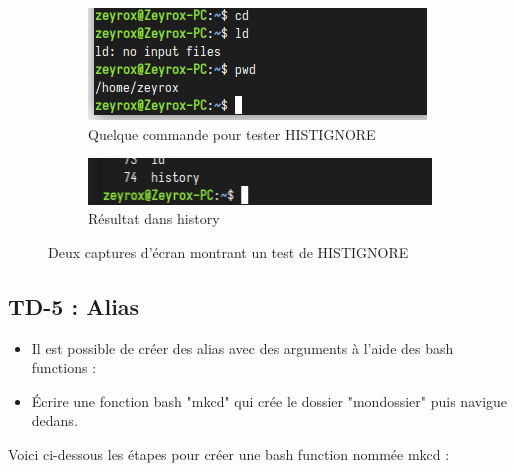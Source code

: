 \documentclass[12pt]{article}
\begin{document}
\begin{figure}[h]
  \centering
  \begin{subfigure}{0.45\textwidth}
    \centering
    \includegraphics[width=\textwidth]{Images-TD-Env-Efficiency/Image-TD-4/commande_test.png}
    \caption{Quelque commande pour tester HISTIGNORE}
  \end{subfigure}
  \vspace{0.9cm} %
  \begin{subfigure}{0.45\textwidth}
    \centering
    \includegraphics[width=\textwidth]{Images-TD-Env-Efficiency/Image-TD-4/history1.png}
    \caption{Résultat dans history}
  \end{subfigure}
  \caption{Deux captures d'écran montrant un test de HISTIGNORE}
\end{figure}

\subsection{TD-5 : Alias}

\begin{itemize}
  \item Il est possible de créer des alias avec des arguments à l'aide des bash functions : 
\end{itemize}

\vspace{0.3cm}

\begin{itemize}
  \item Écrire une fonction bash "mkcd" qui crée le dossier "mondossier" puis navigue dedans.
\end{itemize}

\vspace{0.3cm}

Voici ci-dessous les étapes pour créer une bash function nommée mkcd :
\end{document}
